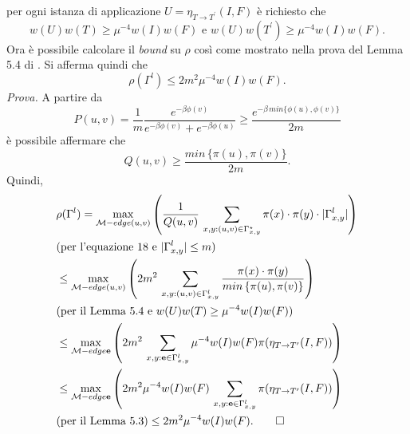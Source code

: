 per ogni istanza di applicazione $U = \eta_{T \rightarrow T^\prime}(I, F)$ è richiesto che
\begin{equation}
	w(U)w(T) \geq \mu^{-4}w(I)w(F) \text{ e } w(U)w(T^\prime) \geq \mu^{-4}w(I)w(F).
\end{equation}
Ora è possibile calcolare il \textit{bound} su $\rho$ così come mostrato nella prova del Lemma 5.4 di \cite{auletta2011convergence}.
Si afferma quindi che
\begin{equation}
	\rho(\Gamma^l) \leq 2m^2\mu^{-4}w(I)w(F).
	\label{eq:newbound}
\end{equation}
\textit{Prova.} A partire da
\begin{equation}
	P(u,v) = \frac{1}{m}\frac{e^{-\beta\phi(v)}}{e^{-\beta\phi(v)} + e^{-\beta\phi(u)}} \geq \frac{e^{-\beta\,min\{\phi(u), \phi(v)\}}}{2m}
\end{equation}
è possibile affermare che
\begin{equation}
	Q(u,v) \geq \frac{min\,\{\pi(u), \pi(v)\}}{2m}.
\end{equation}
Quindi,
\begin{align*}
	&\rho(\Gamma^l) = \max_{\mathcal{M} - edge(u,v)} 
	\left( \frac{1}{Q(u,v)}\,\sum_{x,y: (u,v)\in\Gamma^\star_{x,y}}{\pi(x)\cdot\pi(y)\cdot|\Gamma_{x,y}^l|} 
	\right)\\
	&\text{(per l'equazione 18 e }|\Gamma_{x,y}^l|\leq m\text{)}\\
	&\leq \max_{\mathcal{M} - edge(u,v)}
	\left( 2m^2\,\sum_{x,y: (u,v)\in\Gamma^l_{x,y}}{\frac{\pi(x)\cdot\pi(y)}{min\,\{\pi(u), \pi(v)\}}} 
	\right)\\
	&\text{(per il Lemma 5.4 e }w(U)w(T) \geq \mu^{-4}w(I)w(F)\text{)}\\
	&\leq \max_{\mathcal{M} - edge \textbf{e}}
	\left(2m^2\,\sum_{x,y: \textbf{e}\in\Gamma^l_{x,y}}{\mu^{-4}w(I)w(F)\pi(\eta_{T \rightarrow T^\prime}(I, F))}
	\right)\\
	&\leq \max_{\mathcal{M} - edge \textbf{e}}
	\left(2m^2\mu^{-4}w(I)w(F)\,\sum_{x,y: \textbf{e}\in\Gamma^l_{x,y}}{\pi(\eta_{T \rightarrow T^\prime}(I, F))}
	\right)\\
	&\text{(per il Lemma 5.3)}\leq 2m^2\mu^{-4}w(I)w(F).\qed\\
\end{align*}